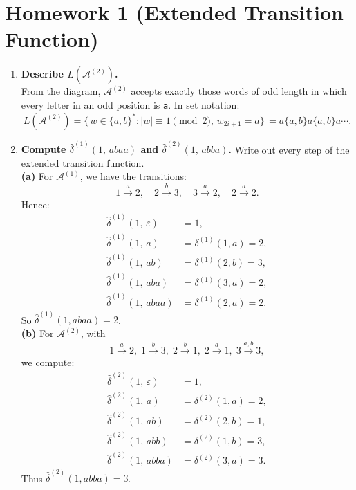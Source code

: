 \documentclass{article}
\begin{document}
\section*{Homework 1 (Extended Transition Function)}
    \begin{enumerate}[1.]
      \item \textbf{Describe $L(\mathcal A^{(2)})$.}\\
        From the diagram, $\mathcal A^{(2)}$ accepts exactly those words of odd length
        in which every letter in an odd position is \texttt{a}.  In set notation:
        \[L(\mathcal A^{(2)})=\{\,w\in\{a,b\}^*: |w|\equiv1\pmod2,\,w_{2i+1}=a\}\,
          = a\{a,b\}a\{a,b\}a\cdots.\]
    
      \item \textbf{Compute $\hat\delta^{(1)}(1,\,abaa)$ and $\hat\delta^{(2)}(1,\,abba)$.}
        Write out every step of the extended transition function.\\
        \textbf{(a)} For $\mathcal A^{(1)}$, we have the transitions:
        \[1\xrightarrow{a}2,\quad2\xrightarrow{b}3,\quad3\xrightarrow{a}2,\quad2\xrightarrow{a}2.\]
        Hence:
        \begin{align*}
          \hat\delta^{(1)}(1,\,\varepsilon)&=1,\\
          \hat\delta^{(1)}(1,\,a)&=\delta^{(1)}(1,a)=2,\\
          \hat\delta^{(1)}(1,\,ab)&=\delta^{(1)}(2,b)=3,\\
          \hat\delta^{(1)}(1,\,aba)&=\delta^{(1)}(3,a)=2,\\
          \hat\delta^{(1)}(1,\,abaa)&=\delta^{(1)}(2,a)=2.
        \end{align*}
        So $\hat\delta^{(1)}(1,abaa)=2$.\\
        \textbf{(b)} For $\mathcal A^{(2)}$, with
        \[1\xrightarrow{a}2,\;1\xrightarrow{b}3,\;2\xrightarrow{b}1,\;2\xrightarrow{a}1,\;3\xrightarrow{a,b}3,\]
        we compute:
        \begin{align*}
          \hat\delta^{(2)}(1,\,\varepsilon)&=1,\\
          \hat\delta^{(2)}(1,\,a)&=\delta^{(2)}(1,a)=2,\\
          \hat\delta^{(2)}(1,\,ab)&=\delta^{(2)}(2,b)=1,\\
          \hat\delta^{(2)}(1,\,abb)&=\delta^{(2)}(1,b)=3,\\
          \hat\delta^{(2)}(1,\,abba)&=\delta^{(2)}(3,a)=3.
        \end{align*}
        Thus $\hat\delta^{(2)}(1,abba)=3$.
    \end{enumerate}
    
\end{document}
